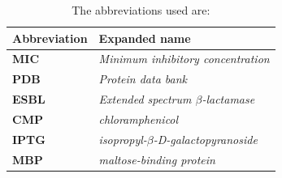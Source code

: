 \documentclass[../main.tex]{subfiles}
\begin{document}
        \begin{table}[]
        \centering
        \caption[Abbreviations used in chapter 2]{The abbreviations used are:}
        \label{tab:ch2-abbreviation-table}
        \begin{tabular}{ll}
        \textbf{Abbreviation}  & \textbf{Expanded name}                    \\ \hline
        \textbf{MIC}  & \textit{Minimum inhibitory concentration} \\ \hline
        \textbf{PDB}  & \textit{Protein data bank}                \\ \hline
        \textbf{ESBL} & \textit{Extended spectrum $\beta$-lactamase}    \\ \hline
        \textbf{CMP}  & \textit{chloramphenicol}                  \\ \hline
        \textbf{IPTG} & \textit{isopropyl-$\beta$-D-galactopyranoside}  \\ \hline
        \textbf{MBP}  & \textit{maltose-binding protein}         
        \end{tabular}
        \end{table}


\end{document}
